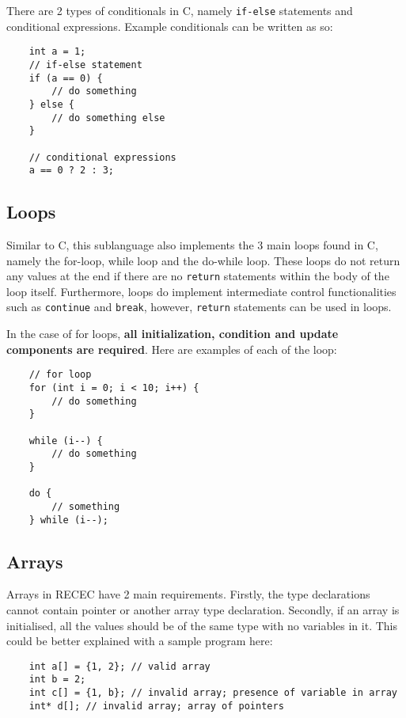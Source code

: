 \documentclass[a4paper]{article}
\begin{document}
There are 2 types of conditionals in C, namely \texttt{if-else} statements and conditional expressions. Example conditionals can be written as so:

\begin{verbatim}
	int a = 1;
	// if-else statement
	if (a == 0) {
		// do something
	} else {
		// do something else
	}

	// conditional expressions
	a == 0 ? 2 : 3;
\end{verbatim}

\subsection{Loops}

Similar to C, this sublanguage also implements the 3 main loops found in C, namely the for-loop, while loop and the do-while loop. These loops do not return any values at the end if there are no \texttt{return} statements within the body of the loop itself. Furthermore, loops do implement intermediate control functionalities such as \texttt{continue} and \texttt{break}, however, \texttt{return} statements can be used in loops. 

In the case of for loops, \textbf{all initialization, condition and update components are required}. Here are examples of each of the loop:

\begin{verbatim}
	// for loop
	for (int i = 0; i < 10; i++) {
		// do something
	}

	while (i--) {
		// do something
	}

	do {
		// something
	} while (i--);
\end{verbatim}

\subsection{Arrays}
Arrays in RECEC have 2 main requirements. Firstly, the type declarations cannot contain pointer or another array type declaration. Secondly, if an array is initialised, all the values should be of the same type with no variables in it. This could be better explained with a sample program here:

\begin{verbatim}
	int a[] = {1, 2}; // valid array
	int b = 2;
	int c[] = {1, b}; // invalid array; presence of variable in array
	int* d[]; // invalid array; array of pointers
\end{verbatim}
\end{document}
